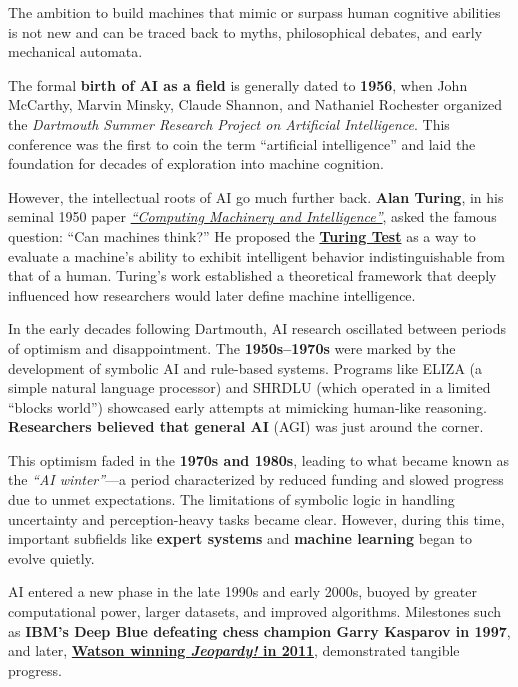 \documentclass[
]{book}
\begin{document}
The ambition to build machines that mimic or surpass human cognitive abilities
is not new and can be traced back to myths, philosophical debates, and early
mechanical automata.

The formal \textbf{birth of AI as a field} is generally dated to \textbf{1956},
when John McCarthy, Marvin Minsky, Claude Shannon, and Nathaniel Rochester
organized the \emph{Dartmouth Summer Research Project on Artificial Intelligence}.
This conference was the first to coin the term ``artificial intelligence'' and
laid the foundation for decades of exploration into machine cognition.

However, the intellectual roots of AI go much further back. \textbf{Alan Turing},
in his seminal 1950 paper \href{https://academic.oup.com/mind/article-abstract/LIX/236/433/986238?redirectedFrom=fulltext}{\emph{``Computing Machinery and Intelligence''}},
asked the
famous question: ``Can machines think?'' He proposed the \href{https://en.wikipedia.org/wiki/Turing_test}{\textbf{Turing Test}}
as a way to evaluate a machine's ability to exhibit intelligent behavior
indistinguishable from that of a human. Turing's work established a
theoretical framework that deeply influenced how researchers would later
define machine intelligence.

In the early decades following Dartmouth, AI research oscillated between
periods of optimism and disappointment.
The \textbf{1950s--1970s} were marked by the development of symbolic AI and
rule-based systems. Programs like ELIZA (a simple natural language processor)
and SHRDLU (which operated in a limited ``blocks world'') showcased early
attempts at mimicking human-like reasoning. \textbf{Researchers believed that general
AI} (AGI) was just around the corner.

This optimism faded in the \textbf{1970s and 1980s}, leading to what became known
as the \emph{``AI winter''}---a period characterized by reduced funding and slowed
progress due to unmet expectations. The limitations of symbolic logic
in handling uncertainty and perception-heavy tasks became clear.
However, during this time, important subfields like \textbf{expert systems}
and \textbf{machine learning} began to evolve quietly.

AI entered a new phase in the late 1990s and early 2000s, buoyed by greater
computational power, larger datasets, and improved algorithms.
Milestones such as
\textbf{IBM's Deep Blue defeating chess champion Garry Kasparov in 1997},
and later, \href{https://www.youtube.com/watch?v=KF6sLCeBj0s&ab_channel=BBCNews}{\textbf{Watson winning \emph{Jeopardy!} in 2011}},
demonstrated tangible progress.
\end{document}
